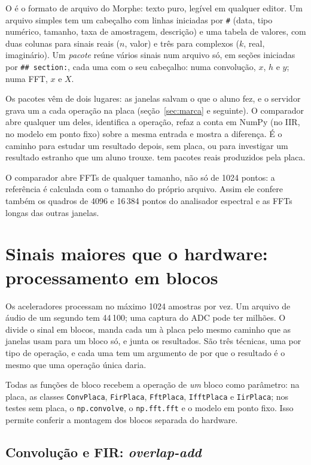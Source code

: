 O  é o formato de arquivo do Morphe: texto puro, legível em
qualquer editor. Um arquivo simples tem um cabeçalho com linhas iniciadas por
\texttt{\#} (data, tipo numérico, tamanho, taxa de amostragem, descrição) e uma
tabela de valores, com duas colunas para sinais reais (\(n\), valor) e três para
complexos (\(k\), real, imaginário). Um \emph{pacote} reúne vários sinais num
arquivo só, em seções iniciadas por \texttt{\#\# section:}, cada uma com o seu
cabeçalho: numa convolução, \(x\), \(h\) e \(y\); numa FFT, \(x\) e \(X\).

Os pacotes vêm de dois lugares: as janelas salvam o que o aluno fez, e o
servidor grava um a cada operação na placa (seção~\ref{sec:marca} e seguinte).
O comparador abre qualquer um deles, identifica a operação, refaz a conta em
NumPy (no IIR, no modelo em ponto fixo) sobre a mesma entrada e mostra a
diferença. É o caminho para estudar um resultado depois, sem placa, ou para
investigar um resultado estranho que um aluno trouxe.  tem
pacotes reais produzidos pela placa.

O comparador abre FFTs de qualquer tamanho, não só de 1024 pontos: a
referência é calculada com o tamanho do próprio arquivo. Assim ele confere
também os quadros de 4096 e 16\,384 pontos do analisador espectral e as FFTs
longas das outras janelas.

\section{Sinais maiores que o hardware: processamento em blocos}
\label{sec:blocos}

Os aceleradores processam no máximo 1024 amostras por vez. Um arquivo de áudio
de um segundo tem 44\,100; uma captura do ADC pode ter milhões. O
 divide o sinal em blocos, manda cada um à placa pelo
mesmo caminho que as janelas usam para um bloco só, e junta os resultados. São
três técnicas, uma por tipo de operação, e cada uma tem um argumento de por que
o resultado é o mesmo que uma operação única daria.

Todas as funções de bloco recebem a operação de \emph{um} bloco como parâmetro:
na placa, as classes \texttt{ConvPlaca}, \texttt{FirPlaca}, \texttt{FftPlaca},
\texttt{IfftPlaca} e \texttt{IirPlaca}; nos testes sem placa, o
\texttt{np.convolve}, o \texttt{np.fft.fft} e o modelo em ponto fixo. Isso
permite conferir a montagem dos blocos separada do hardware.

\subsection{Convolução e FIR: \emph{overlap-add}}

